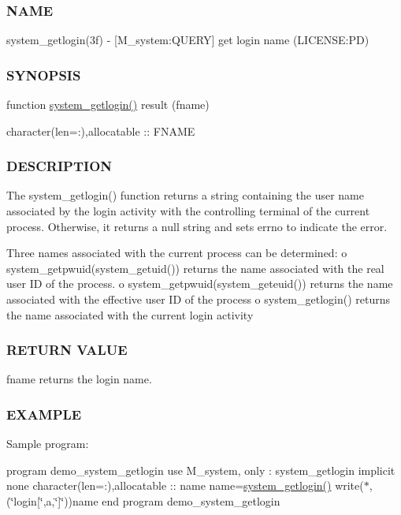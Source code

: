 \subsubsection*{N\+A\+ME}

system\+\_\+getlogin(3f) -\/ \mbox{[}M\+\_\+system\+:Q\+U\+E\+RY\mbox{]} get login name (L\+I\+C\+E\+N\+SE\+:PD) 

\subsubsection*{S\+Y\+N\+O\+P\+S\+IS}

function \mbox{\hyperlink{namespacem__system_a70f78645a1f130734005e190d469529d}{system\+\_\+getlogin()}} result (fname)

character(len=\+:),allocatable \+:\+: F\+N\+A\+ME

\subsubsection*{D\+E\+S\+C\+R\+I\+P\+T\+I\+ON}

\begin{DoxyVerb}The system_getlogin() function returns a string containing the user
name associated by the login activity with the controlling terminal
of the current process. Otherwise, it returns a null string and sets
errno to indicate the error.

Three names associated with the current process can be determined:
   o system_getpwuid(system_getuid()) returns the name associated with the real user ID of the process.
   o system_getpwuid(system_geteuid()) returns the name associated with the effective user ID of the process
   o system_getlogin() returns the name associated with the current login activity
\end{DoxyVerb}


\subsubsection*{R\+E\+T\+U\+RN V\+A\+L\+UE}

fname returns the login name.

\subsubsection*{E\+X\+A\+M\+P\+LE}

Sample program\+:

program demo\+\_\+system\+\_\+getlogin use M\+\_\+system, only \+: system\+\_\+getlogin implicit none character(len=\+:),allocatable \+:\+: name name=\mbox{\hyperlink{namespacem__system_a70f78645a1f130734005e190d469529d}{system\+\_\+getlogin()}} write($\ast$,\textquotesingle{}(\char`\"{}login\mbox{[}\char`\"{},a,\char`\"{}\mbox{]}\char`\"{})\textquotesingle{})name end program demo\+\_\+system\+\_\+getlogin

